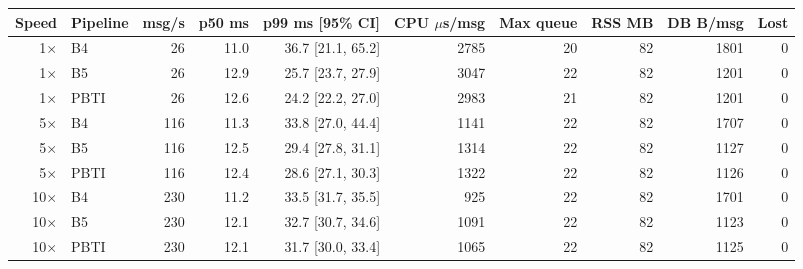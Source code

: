 \begin{tabular}{rlrrrrrrrr}
\toprule
\textbf{Speed} & \textbf{Pipeline} & \textbf{msg/s} & \textbf{p50 ms} & \textbf{p99 ms [95\% CI]} & \textbf{CPU $\mu$s/msg} & \textbf{Max queue} & \textbf{RSS MB} & \textbf{DB B/msg} & \textbf{Lost}\\
\midrule
1$\times$ & B4 & 26 & 11.0 & 36.7 [21.1, 65.2] & 2785 & 20 & 82 & 1801 & 0\\
1$\times$ & B5 & 26 & 12.9 & 25.7 [23.7, 27.9] & 3047 & 22 & 82 & 1201 & 0\\
1$\times$ & PBTI & 26 & 12.6 & 24.2 [22.2, 27.0] & 2983 & 21 & 82 & 1201 & 0\\
5$\times$ & B4 & 116 & 11.3 & 33.8 [27.0, 44.4] & 1141 & 22 & 82 & 1707 & 0\\
5$\times$ & B5 & 116 & 12.5 & 29.4 [27.8, 31.1] & 1314 & 22 & 82 & 1127 & 0\\
5$\times$ & PBTI & 116 & 12.4 & 28.6 [27.1, 30.3] & 1322 & 22 & 82 & 1126 & 0\\
10$\times$ & B4 & 230 & 11.2 & 33.5 [31.7, 35.5] & 925 & 22 & 82 & 1701 & 0\\
10$\times$ & B5 & 230 & 12.1 & 32.7 [30.7, 34.6] & 1091 & 22 & 82 & 1123 & 0\\
10$\times$ & PBTI & 230 & 12.1 & 31.7 [30.0, 33.4] & 1065 & 22 & 82 & 1125 & 0\\
\bottomrule
\end{tabular}